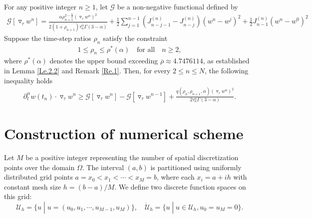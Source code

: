 \documentclass{siamart171218}
\theoremstyle{remark}
\theoremstyle{example}
\numberwithin{equation}{section}
\begin{document}
\begin{theorem}\label{Th.2.6}
For any positive integer $n \geq 1$, let $\mathcal{G}$ be a non-negative functional defined by
\begin{align*}
        \mathcal{G}\left[\triangledown_\tau w^n\right] = \frac{\alpha \rho_{n+1}^{2-\frac{\alpha}{2}} \left(\triangledown_\tau w^n \right)^2}{2 \left(1+\rho_{n+1}\right)\tau_{n}^\alpha \Gamma(3-\alpha)}
        + \frac{1}{2} \sum_{j=1}^{n-1} \left( J_{n-j-1}^{(n)} - J_{n-j}^{(n)} \right) \left( w^n - w^j \right)^2
        + \frac{1}{2} J_{n-1}^{(n)} \left( w^n - w^0 \right)^2
    \end{align*}
Suppose the time-step ratios $\rho_{n}$ satisfy the constraint
\begin{align*}
1 \leq \rho_n \leq \rho^*(\alpha) \quad \text{for all} \quad n \geq 2,
\end{align*}
where $\rho^*(\alpha)$ denotes the upper bound exceeding $\overline{\rho} \approx 4.7476114$, as established in Lemma \ref{Le.2.2} and Remark \ref{Re.1}. Then, for every $2 \leq n \leq N$, the following inequality holds
  \begin{align*}
        \partial^\alpha_t w(t_{n}) \cdot \triangledown_\tau w^n \ge \mathcal{G}\left[\triangledown_\tau w^n\right] - \mathcal{G}\left[\triangledown_\tau w^{n-1}\right] + \frac{q(\rho_n,\rho_{n+1},\alpha) \left(\triangledown_\tau w^{n} \right)^2}{2\tau_{n}^\alpha \Gamma(3-\alpha)}.
    \end{align*}
\end{theorem}

\section{Construction of numerical scheme}\label{sec: Establishment of the numerical scheme}
Let $M$ be a positive integer representing the number of spatial discretization points over the domain $\Omega$. The interval $(a,b)$ is partitioned using uniformly distributed grid points $a=x_0<x_1<\cdots<x_M=b$, where each $x_i = a+ih$ with constant mesh size $h=(b-a)/M$. We define two discrete function spaces on this grid:
$$\mathcal{U}_h=\{u\;|\;u=(u_0,u_1,\cdots,u_{M-1},u_M)\},\quad \mathring{\mathcal{U}}_h=\{u\;|\;u\in \mathcal{U}_h,u_0=u_M=0\}.$$
\end{document}
